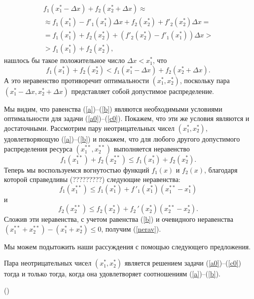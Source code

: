   \begin{multline*}
    f_{1}(x_{1}^{*}-\Delta x)+f_{2}(x_{2}^{*}+\Delta x)\approx \\
    \approx f_{1}(x_{1}^{*})-f'_{1}(x_{1}^{*})\Delta x
    +f_{2}(x_{2}^{*})+f'_{2}(x_{2}^{*})\Delta x= \\
    =f_{1}(x_{1}^{*})+f_{2}(x_{2}^{*})
    +(f'_{2}(x_{2}^{*})-f'_{1}(x_{1}^{*}))\Delta x > \\
    >f_{1}(x_{1}^{*})+f_{2}(x_{2}^{*}),
  \end{multline*}
нашлось бы  такое положительное число ${\Delta x<x_{1}^{*}}$, что
\[f_{1}(x_{1}^{*})+f_{2}(x_{2}^{*})<f_{1}(x_{1}^{*}-\Delta x)+f_{2}(x_{2}^{*}+\Delta x).\]
А это неравенство противоречит оптимальности
$(x_{1}^{*},x_{2}^{*})$, поскольку пара
    $(x_{1}^{*}-\Delta x,x_{2}^{*}+\Delta x)$
представляет собой допустимое распределение.

Мы видим, что равенства (\ref{a})--(\ref{b}) являются необходимыми
условиями оптимальности для задачи (\ref{a0})--(\ref{c0}). Покажем,
что эти же условия являются и достаточными. Рассмотрим пару
неотрицательных чисел $(x_{1}^{*},x_{2}^{*})$, удовлетворяющую
(\ref{a})--(\ref{b}) и покажем, что для любого другого допустимого
распределения ресурса $(x_{1}^{**},x_{2}^{**})$ выполняется
неравенство
\begin{equation}
\label{nerav}
    f_{1}(x_{1}^{**})+f_{2}(x_{2}^{**})\leqslant f_{1}(x_{1}^{*})+f_{2}(x_{2}^{*}).
\end{equation}
    Теперь мы воспользуемся вогнутостью функций $f_{1}(x)$ и
    $f_{2}(x)$, благодаря которой справедливы (?????????) следующие неравенства:
\[f_{1}(x_{1}^{**})\leqslant f_{1}(x_{1}^{*})+f\,'_{1}(x_{1}^{*})(x_{1}^{**}-x_{1}^{*})\]
и
\[f_{2}(x_{2}^{**})\leqslant f_{2}(x_{2}^{*})+f_{2}\,'(x_{2}^{*})(x_{2}^{**}-x_{2}^{*}).\]
    Сложив эти неравенства, с учетом равенства (\ref{b}) и
    очевидного неравенства
    $(x_{1}^{**}+x_{2}^{**})-(x_{1}^{*}+x_{2}^{*})\leqslant0$,
    получим (\ref{nerav}).



Мы можем подытожить наши рассуждения с помощью следующего
предложения.



\begin{prop}
\label{qq} Пара неотрицательных чисел $(x_{1}^{*},x_{2}^{*})$
является решением задачи (\ref{a0})--(\ref{c0}) тогда и только
тогда, когда она удовлетворяет соотношениям (\ref{a})--(\ref{b}).
\end{prop}
    ()




